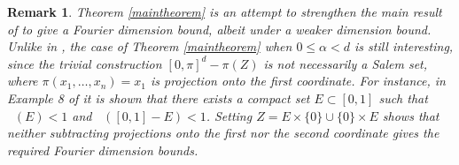 \documentclass[12pt,reqno]{article}
\numberwithin{equation}{section}
\DeclareMathOperator{\minkdim}{\dim_{\mathbf{M}}}
\DeclareMathOperator{\fordim}{\dim_{\mathbf{F}}}
\DeclareMathOperator{\RR}{\mathbf{R}}
\DeclareMathOperator{\ZZ}{\mathbf{Z}}
\newtheorem{remark}{Remark}
\begin{document}
\begin{remark}
    Theorem \ref{maintheorem} is an attempt to strengthen the main result of \cite{OurPaper} to give a Fourier dimension bound, albeit under a weaker dimension bound. Unlike in \cite{OurPaper}, the case of Theorem \ref{maintheorem} when $0 \leq \alpha < d$ is still interesting, since the trivial construction $[0,\pi]^d - \pi(Z)$ is not necessarily a Salem set, where $\pi(x_1, \dots, x_n) = x_1$ is projection onto the first coordinate. For instance, in Example 8 of \cite{Ekstrom2014} it is shown that there exists a compact set $E \subset [0,1]$ such that $\minkdim(E) < 1$ and $\fordim([0,1] - E) < 1$. Setting $Z = E \times \{ 0 \} \cup \{ 0 \} \times E$ shows that neither subtracting projections onto the first nor the second coordinate gives the required Fourier dimension bounds.
\end{remark}

\begin{comment}
A well-known result in this pattern avoidance setting is that sets with large Fourier dimension satisfy many algebraic relations. More precisely, if integer coefficients $m_1, \dots, m_n \in \ZZ$ are fixed, and we consider a compact set $X \subset \RR$ with $\fordim(X) > 2/n$, then the sum set $m_1 X + \dots + m_n X$ contains an open interval. It follows by a slight modification of these coefficients that if $X \subset \RR$ and $\fordim(X) > 2/n$, then there exists $m_1, \dots, m_n \in \ZZ$, distinct points $x_1, \dots, x_n \in X$, and an additional integer $a \in \ZZ$, such that
%
\begin{equation} \label{intequation}
    m_1 x_1 + \dots + m_n x_n = a.
\end{equation}
%
It is an interesting to determine how tight this result is. In \cite{Korner2}, T.W. K\"{o}rner constructs a Salem set $X$ with Fourier dimension $1/(n-1)$ such that for non-zero $m \in \ZZ^n$, and $a \in \ZZ$, $X$ does not contain distinct points $x_1, \dots, x_n$ solving \eqref{intequation}. If, for each nonzero $m \in \ZZ^n$ and $a \in \ZZ$, we consider the set
%
\[ Z_{m,a} = \left\{ (x_1, \dots, x_n) \in [0,1]^n : m_1x_1 + \dots + m_n x_n = a \right\}, \]
%
then $Z_{m,a}$ is a subset of an $n-1$ dimensional hyperplane, and thus can be easily seen to have Minkowski dimension $n-1$. It follows that we can apply Theorem \ref{maintheorem} to $Z = \bigcup \{ Z_{m,a} : m \neq 0, a \in \ZZ \}$ to obtain a Salem set $X \subset [0,1]$ with dimension
%
\[ \frac{n - (n-1)}{n - 1} = \frac{1}{n-1}, \]
%
such that $(x_1, \dots, x_n) \not \in Z$ for each distinct $x_1, \dots, x_n \in X$. This means precisely that $X$ avoids solutions to $\eqref{intequation}$ for all nonzero $m \in \ZZ^n$ and $a \in \ZZ$. Thus we see Theorem \ref{maintheorem} generalizes K\"{o}rner's result, and thus shows the result depends little on the arithmetic properties of the pattern K\"{o}rner avoids, but rather, depends only on the `thickness' of the family of tuples $(x_1, \dots, x_n)$ satisfying the pattern. Since we expect Theorem \ref{maintheorem} to be tight for general sets, an improvement to K\"{o}rner's construction must rely more heavily on the algebraic properties of the pattern involved.
\end{comment}
\end{document}
